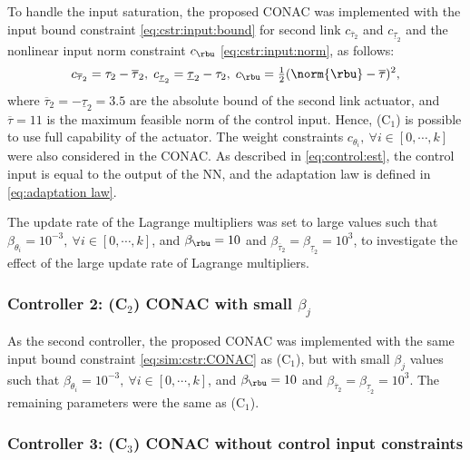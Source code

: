 \documentclass[lettersize,journal]{IEEEtran}
\begin{document}
To handle the input saturation, the proposed CONAC was implemented with the input bound constraint \eqref{eq:cstr:input:bound} for second link $c_{\overline\tau_2}$ and $c_{\underline\tau_2}$ and the nonlinear input norm constraint $c_{\rbu}$ \eqref{eq:cstr:input:norm}, as follows:
\begin{equation}
    c_{\overline\tau_2}     
    =
    \tau_2-\overline\tau_2
    ,
    \;
    c_{\underline\tau_2} 
    =
    \underline\tau_2-\tau_2
    ,
    \;
    c_{\rbu}
    =
    \tfrac{1}{2}
    (
        \norm{\rbu}-\overline\tau
    )^2 
    ,
    \label{eq:sim:cstr:CONAC}
\end{equation}
where $\overline\tau_2=-\underline{\tau}_2=3.5$ are the absolute bound of the second link actuator, and $\overline\tau=11$ is the maximum feasible norm of the control input.
Hence, (C$_1$) is possible to use full capability of the actuator.
The weight constraints $c_{\theta_i},\ \forall i\in[0,\cdots,k]$ were also considered in the CONAC.
As described in \eqref{eq:control:est}, the control input is equal to the output of the NN, and the adaptation law is defined in \eqref{eq:adaptation law}.

The update rate of the Lagrange multipliers was set to large values such that $\beta_{\theta_i}=10^{-3},\ \forall i\in[0,\cdots,k]$, and $\beta_{\rbu}=10$ and $\beta_{\overline{\tau}_2}=\beta_{\underline{\tau}_2}=10^{3}$, to investigate the effect of the large update rate of Lagrange multipliers.

\subsubsection*{Controller 2: (C$_2$) CONAC with small $\beta_j$}

As the second controller, the proposed CONAC was implemented with the same input bound constraint \eqref{eq:sim:cstr:CONAC} as (C$_1$), but with small $\beta_j$ values such that $\beta_{\theta_i}=10^{-3},\ \forall i\in[0,\cdots,k]$, and $\beta_{\rbu}=10$ and $\beta_{\overline{\tau}_2}=\beta_{\underline{\tau}_2}=10^{3}$.
The remaining parameters were the same as (C$_1$).

\subsubsection*{Controller 3: (C$_3$) CONAC without control input constraints}
\end{document}
